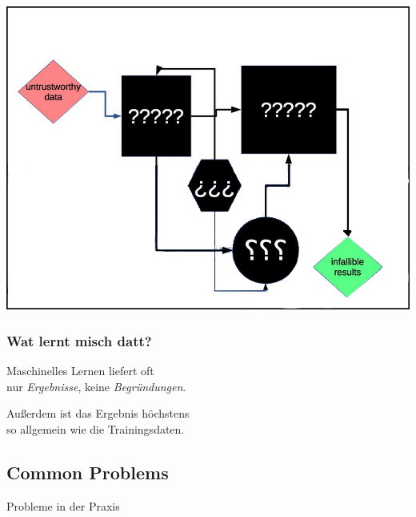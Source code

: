 \documentclass[aspectratio=169,x11names]{beamer}
\begin{document}
\begin{frame}
\begin{center}
\includegraphics[height=0.65\textheight,keepaspectratio]{images/deep_neural_networks_4.png} 
\end{center}
\end{frame}

\begin{frame}
\frametitle{Wat lernt misch datt?}
\begin{center}
\color{red}
\large
Maschinelles Lernen liefert oft\\nur \emph{Ergebnisse}, keine \emph{Begründungen}.
\pause\bigskip

Außerdem ist das Ergebnis höchstens\\so allgemein wie die Trainingsdaten.
\end{center}
\end{frame}


\subsection{Common Problems}

\begin{frame}
\begin{center}
\huge
Probleme in der Praxis
\end{center}
\end{frame}
\end{document}
